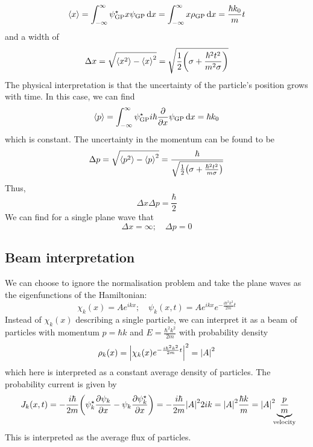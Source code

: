 \[
	\left\langle{x}\right\rangle = \int_{-\infty}^\infty \psi_{\text{GP}}^\star x \psi_{\text{GP}} \dd{x} = \int_{-\infty}^\infty x \rho_{\text{GP}} \dd{x} = \frac{\hbar k_0}{m} t
\]
and a width of
\[
	\Delta x = \sqrt{\left\langle{x^2}\right\rangle - \left\langle{x}\right\rangle^2} = \sqrt{\frac{1}{2} \qty(\sigma + \frac{\hbar^2 t^2}{m^2 \sigma})}
\]
The physical interpretation is that the uncertainty of the particle's position grows with time.
In this case, we can find
\[
	\left\langle{p}\right\rangle = \int_{-\infty}^\infty \psi_{\text{GP}}^\star i \hbar \pdv{x} \psi_{\text{GP}} \dd{x} = \hbar k_0
\]
which is constant.
The uncertainty in the momentum can be found to be
\[
	\Delta p = \sqrt{\left\langle{p^2}\right\rangle - \left\langle{p}\right\rangle^2} = \frac{\hbar}{\sqrt{\frac{1}{2} \qty(\sigma + \frac{\hbar^2 t^2}{m \sigma})}}
\]
Thus,
\[
	\Delta x \Delta p = \frac{\hbar}{2}
\]
We can find for a single plane wave that
\[
	\Delta x = \infty;\quad \Delta p = 0
\]

\subsection{Beam interpretation}
We can choose to ignore the normalisation problem and take the plane waves as the eigenfunctions of the Hamiltonian:
\[
	\chi_k(x) = Ae^{ikx};\quad \psi_k(x,t) = Ae^{ikx}e^{-\frac{i \hbar^2 k^2}{2m} t}
\]
Instead of \( \chi_k(x) \) describing a single particle, we can interpret it as a beam of particles with momentum \( p = \hbar k \) and \( E = \frac{\hbar^2 k^2}{2m} \) with probability density
\[
	\rho_k(x) = \abs{\chi_k(x) e^{-\frac{i\hbar^2 k^2}{2m}t}}^2 = \abs{A}^2
\]
which here is interpreted as a constant average density of particles.
The probability current is given by
\[
	J_k(x,t) = - \frac{i\hbar}{2m} \qty(\psi^\star_k \pdv{\psi_k}{x} - \psi_k \pdv{\psi_k^\star}{x}) = -\frac{i\hbar}{2m} \abs{A}^2 2ik = \abs{A}^2 \frac{\hbar k}{m} = \abs{A}^2 \underbrace{\frac{p}{m}}_{\mathclap{\text{velocity}}}
\]
This is interpreted as the average flux of particles.

